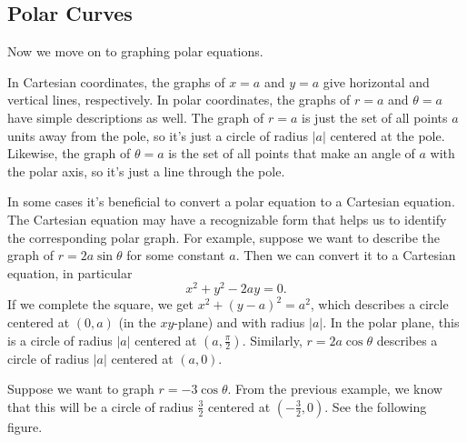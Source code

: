 \documentclass[10pt,]{book}
\theoremstyle{ptxplainnotitle}
\theoremstyle{ptxplaintitle}
\theoremstyle{ptxplainnotitle}
\theoremstyle{ptxplaintitle}
\theoremstyle{ptxplainnotitle}
\theoremstyle{ptxplaintitle}
\theoremstyle{ptxdefinitionnotitle}
\theoremstyle{ptxdefinitiontitle}
\theoremstyle{ptxdefinitionnotitle}
\theoremstyle{ptxdefinitiontitle}
\theoremstyle{ptxdefinitionnotitle}
\theoremstyle{ptxdefinitiontitle}
\theoremstyle{ptxdefinitionnotitle}
\theoremstyle{ptxdefinitiontitle}
\theoremstyle{ptxdefinitionnotitle}
\theoremstyle{ptxdefinitiontitle}
\numberwithin{equation}{section}
\begin{document}
\subsection[{Polar Curves}]{Polar Curves}\label{subsection-polar-curves}
\hypertarget{p-684}{}%
Now we move on to graphing polar equations.%
\begin{example}\label{example-graphs-of-constants-in-polar-coordinates}
\hypertarget{p-685}{}%
In Cartesian coordinates, the graphs of \(x=a\) and \(y=a\) give horizontal and vertical lines, respectively. In polar coordinates, the graphs of \(r=a\) and \(\theta=a\) have simple descriptions as well. The graph of \(r=a\) is just the set of all points \(a\) units away from the pole, so it's just a circle of radius \(|a|\) centered at the pole. Likewise, the graph of \(\theta = a\) is the set of all points that make an angle of \(a\) with the polar axis, so it's just a line through the pole.%
\end{example}
\begin{example}\label{example-graphs-from-cartesian-equations}
\hypertarget{p-686}{}%
In some cases it's beneficial to convert a polar equation to a Cartesian equation. The Cartesian equation may have a recognizable form that helps us to identify the corresponding polar graph. For example, suppose we want to describe the graph of \(r = 2a\sin\theta\) for some constant \(a\). Then we can convert it to a Cartesian equation, in particular%
%
\begin{equation*}
x^{2}+y^{2} - 2ay = 0.
\end{equation*}
\hypertarget{p-687}{}%
If we complete the square, we get \(x^{2}+(y-a)^{2} = a^{2}\), which describes a circle centered at \((0,a)\) (in the \(xy\)-plane) and with radius \(|a|\). In the polar plane, this is a circle of radius \(|a|\) centered at \((a,\frac{\pi}{2}).\) Similarly, \(r=2a\cos\theta\) describes a circle of radius \(|a|\) centered at \((a,0)\).%
\end{example}
\begin{example}\label{example-another-circle}
\hypertarget{p-688}{}%
Suppose we want to graph \(r=-3\cos\theta\). From the previous example, we know that this will be a circle of radius \(\frac{3}{2}\) centered at \((-\frac{3}{2},0)\). See the following figure.%
\end{example}
\end{document}
